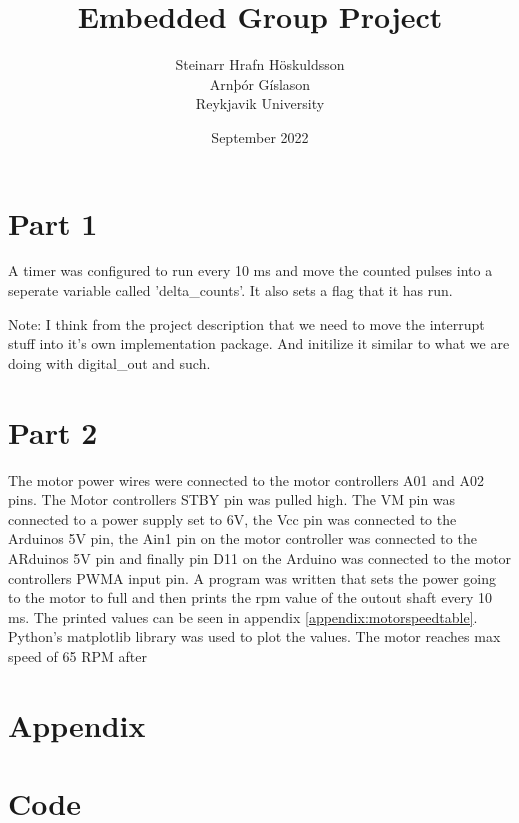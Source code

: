 \documentclass{article}
\title{Embedded Group Project}
\author{Steinarr Hrafn Höskuldsson\\
Arnþór Gíslason\\
Reykjavik University}
\date{September 2022}
\newcommand{\mycomment}[1]{}
\begin{document}
\maketitle
\mycomment{
\begin{figure}[h]
    \centering
    \texttt{[image: LAB3/Basic1.png]}
    \caption{"Switch test" Breadboard set up}
    \label{fig:Switch_test}
\end{figure}



}

\section*{Part 1}
A timer was configured to run every 10 ms and move the counted pulses into a seperate variable called 'delta\_counts'. It also sets a flag that it has run.

Note: I think from the project description that we need to move the interrupt stuff into it's own implementation package. And initilize it similar to what we are doing with digital\_out and such.

\section*{Part 2}
The motor power wires were connected to the motor controllers A01 and A02 pins. The Motor controllers STBY pin was pulled high. The VM pin was connected to a power supply set to 6V, the Vcc pin was connected to the Arduinos 5V pin, the Ain1 pin on the motor controller was connected to the ARduinos 5V pin and finally pin D11 on the Arduino was connected to the motor controllers PWMA input pin. 
A program was written that sets the power going to the motor to full and then prints the rpm value of the outout shaft every 10 ms.
The printed values can be seen in appendix \ref{appendix:motorspeedtable}. Python's matplotlib library was used to plot the values. The motor reaches max speed of 65 RPM after 

\maketitle

\section*{Appendix}
\appendix
\section{Code}\label{appendix:code}






\end{document}
